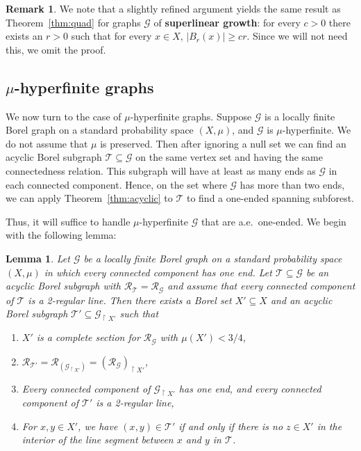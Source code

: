 \documentclass[11pt]{amsart}
\theoremstyle{definition}
\newtheorem{remark}[definition]{Remark}
\theoremstyle{plain}
\newtheorem{lemma}[definition]{Lemma}
\newcommand{\<}{\langle}
\renewcommand{\>}{\rangle}
\newcommand{\Ggraph}{\mathcal{G}}
\newcommand{\Tgraph}{\mathcal{T}}
\newcommand{\define}[1]{\textbf{#1}}
\newcommand\RR{\mathscr{R}}
\begin{document}
\begin{remark}
We note that a slightly refined argument yields the same result as
Theorem~\ref{thm:quad} for
graphs $\Ggraph$ of \define{superlinear growth}: for every $c > 0$ there exists an $r > 0$
such that for every $x \in X$, $|B_r(x)| \geq cr$. Since we will not need this, we omit the proof.
\end{remark}

\subsection{\texorpdfstring{$\mu$-hyperfinite graphs}{mu-hyperfinite graphs}}\label{sec:hyperfinite}

We now turn to the case of $\mu$-hyperfinite graphs. Suppose ${\Ggraph}$ is
a locally finite Borel graph on a standard probability space $(X,\mu)$, and
$\Ggraph$ is $\mu$-hyperfinite. We do not assume that $\mu$ is preserved.
Then after ignoring a null set we can find
an acyclic Borel subgraph $\Tgraph \subseteq \Ggraph$ on the same vertex set
and having the same connectedness relation. This subgraph will have at
least as many ends as $\Ggraph$ in each connected component. Hence, on the
set where $\Ggraph$ has more than two ends, we can apply
Theorem~\ref{thm:acyclic} to $\Tgraph$ to find a one-ended spanning
subforest.

Thus, it will suffice to handle $\mu$-hyperfinite $\Ggraph$ that are a.e.\ one-ended.
We begin with the following lemma:

\begin{lemma}\label{lem:2in1lem}
Let ${\Ggraph}$ be a locally finite Borel graph on a standard probability
space $(X,\mu)$ in which every connected component has one end. Let
${\Tgraph}\subseteq {\Ggraph}$ be an acyclic Borel subgraph with
$\RR_{{\Tgraph}}=\RR_{{\Ggraph}}$ and assume that every connected component of
${\Tgraph}$ is a 2-regular line. Then there exists a Borel set
$X'\subseteq X$ and an acyclic Borel subgraph ${\Tgraph}'\subseteq {\Ggraph}_{\restriction  X'}$ such that
\begin{enumerate}
\item $X'$ is a complete section for $\RR_{\Ggraph}$ with $\mu (X') < 3/4$,
\item $\RR_{{\Tgraph}'} = \RR_{({\Ggraph}_{\restriction  X'})} = (\RR_{\Ggraph})_{\restriction  X'}$,
\item Every connected component of ${\Ggraph}_{\restriction  X'}$ has one end, and every connected component of ${\Tgraph}'$ is a 2-regular line,
\item For $x,y\in X'$, we have $(x,y)\in \mathcal{\Tgraph}'$ if and only if there is no $z\in X'$ in the interior of the line segment between $x$ and $y$ in $\Tgraph$.
\end{enumerate}
\end{lemma}
\end{document}
